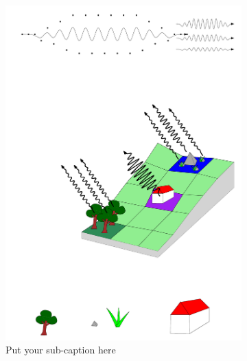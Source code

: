 \begin{figure}[ht]
	\begin{subfigure}{.5\textwidth}
		\centering
	\includegraphics[width=1\linewidth,trim={2cm 6cm 0cm 8cm},clip]{figures/example1/figure} %
		\caption{Put your sub-caption here}
		\label{fig:sub-first}
	\end{subfigure}
	\begin{subfigure}{.5\textwidth}
		\centering

\end{subfigure}
\end{figure}
